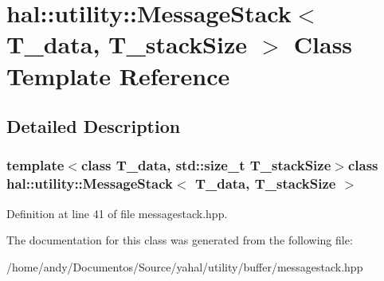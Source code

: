 \hypertarget{classhal_1_1utility_1_1_message_stack}{}\section{hal\+:\+:utility\+:\+:Message\+Stack$<$ T\+\_\+data, T\+\_\+stack\+Size $>$ Class Template Reference}
\label{classhal_1_1utility_1_1_message_stack}


\subsection{Detailed Description}
\subsubsection*{template$<$class T\+\_\+data, std\+::size\+\_\+t T\+\_\+stack\+Size$>$class hal\+::utility\+::\+Message\+Stack$<$ T\+\_\+data, T\+\_\+stack\+Size $>$}



Definition at line 41 of file messagestack.\+hpp.



The documentation for this class was generated from the following file\+:\begin{DoxyCompactItemize}
\item 
/home/andy/\+Documentos/\+Source/yahal/utility/buffer/messagestack.\+hpp\end{DoxyCompactItemize}
